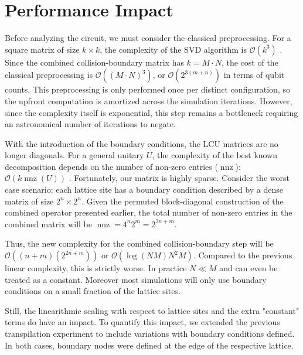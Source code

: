 \section{Performance Impact}
\label{sec:bc-complexity}

Before analyzing the circuit, we must consider the classical preprocessing.
For a square matrix of size $k \times k$, the complexity of the SVD algorithm is $\mathcal{O}(k^3)$ \cite{horn2012matrix}.
Since the combined collision-boundary matrix has $k = M\cdot N$, the cost of the classical preprocessing is $\mathcal{O}((M \cdot N)^3)$, or $\mathcal{O}(2^{3(m+n)})$ in terms of qubit counts.
This preprocessing is only performed once per distinct configuration, so the upfront computation is amortized across the simulation iterations.
However, since the complexity itself is exponential, this step remains a bottleneck requiring an astronomical number of iterations to negate.

With the introduction of the boundary conditions, the LCU matrices are no longer diagonals.
For a general unitary $U$, the complexity of the best known decomposition depends on the number of non-zero entries ($\operatorname{nnz}$): $\mathcal{O}(k\operatorname{nnz}(U))$ \cite{malvetti2021quantum}.
Fortunately, our matrix is highly sparse. Consider the worst case scenario: each lattice site has a boundary condition described by a dense matrix of size $2^n \times 2^n$.
Given the permuted block-diagonal construction of the combined operator presented earlier, the total number of non-zero entries in the combined matrix will be $\operatorname{nnz}=4^n2^m=2^{2n+m}$.

Thus, the new complexity for the combined collision-boundary step will be $\mathcal{O}((n+m)(2^{2n+m}))$ or $\mathcal{O}(\log(NM)N^2M)$.
Compared to the previous linear complexity, this is strictly worse. In practice $N \ll M$ and can even be treated as a constant. Moreover most simulations will only use boundary conditions on a small fraction of the lattice sites.

Still, the linearithmic scaling with respect to lattice sites and the extra "constant" terms do have an impact.
To quantify this impact, we extended the previous transpilation experiment to include variations with boundary conditions defined.
In both cases, boundary nodes were defined at the edge of the respective lattice.

